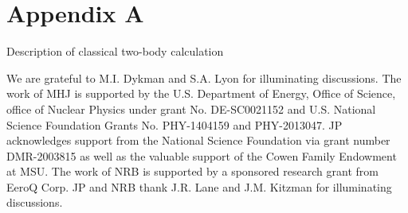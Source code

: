 \documentclass[twocolumn,superscriptaddress,unsortedaddress,
 amsmath,amssymb,
 aps,
]{revtex4-2}
\begin{document}
\section{Appendix A}
Description of classical two-body calculation


\begin{acknowledgments}
We are grateful to M.I. Dykman and S.A. Lyon for illuminating discussions. The work of MHJ is supported by the U.S. Department of Energy, Office of Science, office of Nuclear Physics under grant No. DE-SC0021152 and U.S. National Science Foundation Grants No. PHY-1404159 and PHY-2013047. JP acknowledges support from the National Science Foundation via grant number DMR-2003815 as well as the valuable support of the Cowen Family Endowment at MSU. The work of NRB is supported by a sponsored research grant from EeroQ Corp. JP and NRB thank J.R. Lane and J.M. Kitzman for illuminating discussions.
\end{acknowledgments}
\end{document}
